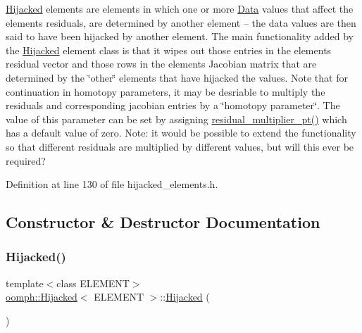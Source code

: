 \hyperlink{classoomph_1_1Hijacked}{Hijacked} elements are elements in which one or more \hyperlink{classoomph_1_1Data}{Data} values that affect the element\textquotesingle{}s residuals, are determined by another element -- the data values are then said to have been hijacked by another element. The main functionality added by the \hyperlink{classoomph_1_1Hijacked}{Hijacked} element class is that it wipes out those entries in the element\textquotesingle{}s residual vector and those rows in the element\textquotesingle{}s Jacobian matrix that are determined by the \char`\"{}other\char`\"{} elements that have hijacked the values. Note that for continuation in homotopy parameters, it may be desriable to multiply the residuals and corresponding jacobian entries by a \char`\"{}homotopy parameter\char`\"{}. The value of this parameter can be set by assigning \hyperlink{classoomph_1_1HijackedElementBase_affdb1888fb6b2de051bc0345e6f5d934}{residual\+\_\+multiplier\+\_\+pt()} which has a default value of zero. Note\+: it would be possible to extend the functionality so that different residuals are multiplied by different values, but will this ever be required? 

Definition at line 130 of file hijacked\+\_\+elements.\+h.



\subsection{Constructor \& Destructor Documentation}
\mbox{\label{classoomph_1_1Hijacked_aaf792ec7672bf812fdc5b3e74c31f807}} 
\subsubsection{\texorpdfstring{Hijacked()}{Hijacked()}\hspace{0.1cm}{\footnotesize\ttfamily [1/3]}}
{\footnotesize\ttfamily template$<$class E\+L\+E\+M\+E\+NT$>$ \\
\hyperlink{classoomph_1_1Hijacked}{oomph\+::\+Hijacked}$<$ E\+L\+E\+M\+E\+NT $>$\+::\hyperlink{classoomph_1_1Hijacked}{Hijacked} (\begin{DoxyParamCaption}{ }\end{DoxyParamCaption})\hspace{0.3cm}{\ttfamily [inline]}}



